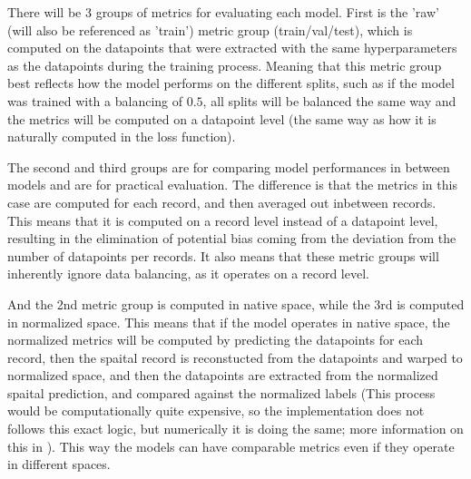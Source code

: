 There will be 3 groups of metrics for evaluating each model. First is the 'raw' (will also be referenced as 'train') metric group (train/val/test), which is computed on the datapoints that were extracted with the same hyperparameters as the datapoints during the training process. Meaning that this metric group best reflects how the model performs on the different splits, such as if the model was trained with a balancing of $0.5$, all splits will be balanced the same way and the metrics will be computed on a datapoint level (the same way as how it is naturally computed in the loss function).\par
The second and third groups are for comparing model performances in between models and are for practical evaluation. The difference is that the metrics in this case are computed for each record, and then averaged out inbetween records. This means that it is computed on a record level instead of a datapoint level, resulting in the elimination of potential bias coming from the deviation from the number of datapoints per records. It also means that these metric groups will inherently ignore data balancing, as it operates on a record level.\par
And the 2nd metric group is computed in native space, while the 3rd is computed in normalized space. This means that if the model operates in native space, the normalized metrics will be computed by predicting the datapoints for each record, then the spaital record is reconstucted from the datapoints and warped to normalized space, and then the datapoints are extracted from the normalized spaital prediction, and compared against the normalized labels (This process would be computationally quite expensive, so the implementation does not follows this exact logic, but numerically it is doing the same; more information on this in ). This way the models can have comparable metrics even if they operate in different spaces.











